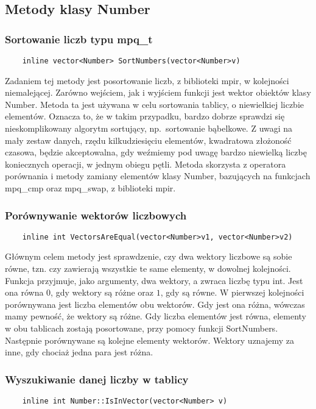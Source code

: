 \documentclass[oneside,a4paper]{book}
\begin{document}
	\subsection{Metody klasy Number}
	
	\subsubsection{Sortowanie liczb typu mpq\_t}
	\begin{lstlisting}
	inline vector<Number> SortNumbers(vector<Number>v)
	\end{lstlisting}
	
	Zadaniem tej metody jest posortowanie liczb, z biblioteki mpir, w kolejności niemalejącej. Zarówno wejściem, jak i wyjściem funkcji jest wektor obiektów klasy Number. Metoda ta jest używana w celu sortowania tablicy, o niewielkiej liczbie elementów. Oznacza to, że w takim przypadku, bardzo dobrze sprawdzi się nieskomplikowany algorytm sortujący, np.\ sortowanie bąbelkowe. Z uwagi na mały zestaw danych, rzędu kilkudziesięciu elementów, kwadratowa złożoność czasowa, będzie akceptowalna, gdy weźmiemy pod uwagę bardzo niewielką liczbę koniecznych operacji, w jednym obiegu pętli. Metoda skorzysta z operatora porównania i metody zamiany elementów klasy Number, bazujących na funkcjach mpq\_cmp oraz mpq\_swap, z biblioteki mpir.
	
	\subsubsection{Porównywanie wektorów liczbowych}
	\begin{lstlisting}
	inline int VectorsAreEqual(vector<Number>v1, vector<Number>v2)
	\end{lstlisting}
	
	Głównym celem metody jest sprawdzenie, czy dwa wektory liczbowe są sobie równe, tzn. czy zawierają wszystkie te same elementy, w dowolnej kolejności. Funkcja przyjmuje, jako argumenty, dwa wektory, a zwraca liczbę typu int. Jest ona równa $0$, gdy wektory są różne oraz $1$, gdy są równe. W pierwszej kolejności porównywana jest liczba elementów obu wektorów. Gdy jest ona różna, wówczas mamy pewność, że wektory są różne. Gdy liczba elementów jest równa, elementy w obu tablicach zostają posortowane, przy pomocy funkcji SortNumbers. Następnie porównywane są kolejne elementy wektorów. Wektory uznajemy za inne, gdy chociaż jedna para jest różna.
	
	\subsubsection{Wyszukiwanie danej liczby w tablicy}
	\begin{lstlisting}
	inline int Number::IsInVector(vector<Number> v)
	\end{lstlisting}
	
\end{document}
